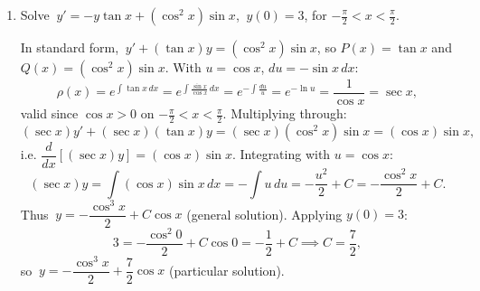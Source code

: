 \documentclass[10pt]{article}
\begin{document}
\begin{enumerate}[leftmargin=*, label=\numbox{\arabic*}]
\item
    \begin{problem}[7cm]
        Solve \(\ y' = -y\tan x + (\cos^2 x)\sin x\), \(\ y(0) = 3\), for \(-\tfrac{\pi}{2} < x < \tfrac{\pi}{2}\).
    \end{problem}
    \begin{solution}
        In standard form, \(\ y' + (\tan x)y = (\cos^2 x)\sin x\), so \(P(x) = \tan x\) and
        \(Q(x) = (\cos^2 x)\sin x\). With \(u = \cos x\), \(du = -\sin x\,dx\):
        \[
            \rho(x) = e^{\int \tan x\,dx} = e^{\int \frac{\sin x}{\cos x}\,dx}
            = e^{-\int \frac{du}{u}} = e^{-\ln u} = \frac{1}{\cos x} = \sec x,
        \]
        valid since \(\cos x > 0\) on \(-\tfrac{\pi}{2} < x < \tfrac{\pi}{2}\). Multiplying through:
        \[
            (\sec x)y' + (\sec x)(\tan x)y = (\sec x)(\cos^2 x)\sin x = (\cos x)\sin x,
        \]
        i.e. \(\dfrac{d}{dx}\!\left[(\sec x)y\right] = (\cos x)\sin x\). Integrating with \(u = \cos x\):
        \[
            (\sec x)y = \int (\cos x)\sin x\,dx = -\int u\,du = -\frac{u^2}{2} + C = -\frac{\cos^2 x}{2} + C.
        \]
        Thus \(\ y = -\dfrac{\cos^3 x}{2} + C\cos x\) (general solution). Applying \(y(0) = 3\):
        \[
            3 = -\frac{\cos^2 0}{2} + C\cos 0 = -\frac{1}{2} + C \implies C = \frac{7}{2},
        \]
        so \(\ y = -\dfrac{\cos^3 x}{2} + \dfrac{7}{2}\cos x\) (particular solution).
    \end{solution}

\end{enumerate}
\end{document}
